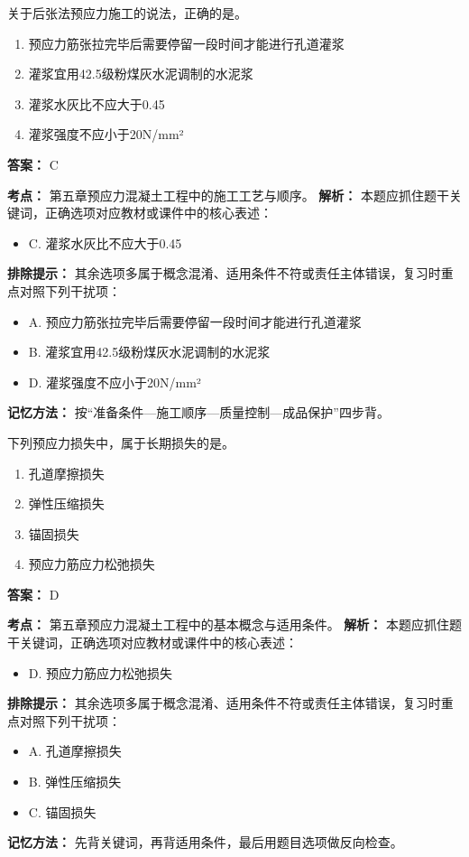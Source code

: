 \documentclass[UTF8,fontset=fandol,11pt]{ctexart}
\begin{document}
\begin{quizbox}[title={第 5 题}]
关于后张法预应力施工的说法，正确的是。\\
\begin{enumerate}[label=\Alph*.]
\item 预应力筋张拉完毕后需要停留一段时间才能进行孔道灌浆
\item 灌浆宜用42.5级粉煤灰水泥调制的水泥浆
\item 灌浆水灰比不应大于0.45
\item 灌浆强度不应小于20N/mm²
\end{enumerate}
\textbf{答案：} C
\vspace{0.25em}
\begin{answerbox}[title={考点解析}]
\textbf{考点：} 第五章预应力混凝土工程中的施工工艺与顺序。
\textbf{解析：} 本题应抓住题干关键词，正确选项对应教材或课件中的核心表述：
\begin{itemize}
\item C. 灌浆水灰比不应大于0.45
\end{itemize}
\textbf{排除提示：} 其余选项多属于概念混淆、适用条件不符或责任主体错误，复习时重点对照下列干扰项：
\begin{itemize}
\item A. 预应力筋张拉完毕后需要停留一段时间才能进行孔道灌浆
\item B. 灌浆宜用42.5级粉煤灰水泥调制的水泥浆
\item D. 灌浆强度不应小于20N/mm²
\end{itemize}
\textbf{记忆方法：} 按“准备条件—施工顺序—质量控制—成品保护”四步背。
\end{answerbox}
\end{quizbox}

\begin{quizbox}[title={第 6 题}]
下列预应力损失中，属于长期损失的是。\\
\begin{enumerate}[label=\Alph*.]
\item 孔道摩擦损失
\item 弹性压缩损失
\item 锚固损失
\item 预应力筋应力松弛损失
\end{enumerate}
\textbf{答案：} D
\vspace{0.25em}
\begin{answerbox}[title={考点解析}]
\textbf{考点：} 第五章预应力混凝土工程中的基本概念与适用条件。
\textbf{解析：} 本题应抓住题干关键词，正确选项对应教材或课件中的核心表述：
\begin{itemize}
\item D. 预应力筋应力松弛损失
\end{itemize}
\textbf{排除提示：} 其余选项多属于概念混淆、适用条件不符或责任主体错误，复习时重点对照下列干扰项：
\begin{itemize}
\item A. 孔道摩擦损失
\item B. 弹性压缩损失
\item C. 锚固损失
\end{itemize}
\textbf{记忆方法：} 先背关键词，再背适用条件，最后用题目选项做反向检查。
\end{answerbox}
\end{quizbox}
\end{document}
